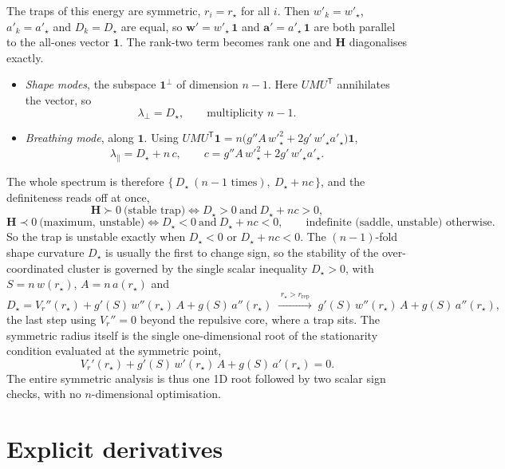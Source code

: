 \documentclass[11pt]{article}
\newcommand{\one}{\mathbf{1}}
\newcommand{\wv}{\mathbf{w}'}
\newcommand{\av}{\mathbf{a}'}
\newcommand{\tp}{^{\mathsf T}}
\begin{document}
The traps of this energy are symmetric, $r_i=r_\star$ for all $i$. Then $w'_k=w'_\star$,
$a'_k=a'_\star$ and $D_k=D_\star$ are equal, so $\wv=w'_\star\,\one$ and
$\av=a'_\star\,\one$ are both parallel to the all-ones vector $\one$. The rank-two term
becomes rank one and $\mathbf{H}$ diagonalises exactly.
\begin{itemize}
\item \emph{Shape modes}, the subspace $\one^{\perp}$ of dimension $n-1$. Here $UMU\tp$
      annihilates the vector, so
      \[
      \lambda_{\perp}=D_\star,\qquad\text{multiplicity } n-1 .
      \]
\item \emph{Breathing mode}, along $\one$. Using
      $UMU\tp\one=n\bigl(g''A\,w'^2_\star+2g'\,w'_\star a'_\star\bigr)\one$,
      \[
      \lambda_{\parallel}=D_\star+n\,c,\qquad
      c=g''A\,w'^2_\star+2g'\,w'_\star a'_\star .
      \]
\end{itemize}
The whole spectrum is therefore $\{\,D_\star\ (n-1\text{ times}),\ D_\star+nc\,\}$, and the
definiteness reads off at once,
\[
\boxed{\;
\mathbf{H}\succ0\ \text{(stable trap)}\iff D_\star>0\ \text{and}\ D_\star+nc>0,
\;}
\]
\[
\mathbf{H}\prec0\ \text{(maximum, unstable)}\iff D_\star<0\ \text{and}\ D_\star+nc<0,
\qquad\text{indefinite (saddle, unstable) otherwise.}
\]
So the trap is unstable exactly when $D_\star<0$ or $D_\star+nc<0$. The $(n-1)$-fold shape
curvature $D_\star$ is usually the first to change sign, so the stability of the
over-coordinated cluster is governed by the single scalar inequality $D_\star>0$, with
$S=n\,w(r_\star)$, $A=n\,a(r_\star)$ and
\[
D_\star=V_r''(r_\star)+g'(S)\,w''(r_\star)\,A+g(S)\,a''(r_\star)
\;\xrightarrow{\;r_\star>r_{\mathrm{rep}}\;}\;
g'(S)\,w''(r_\star)\,A+g(S)\,a''(r_\star),
\]
the last step using $V_r''=0$ beyond the repulsive core, where a trap sits. The symmetric
radius itself is the single one-dimensional root of the stationarity condition evaluated at
the symmetric point,
\[
V_r'(r_\star)+g'(S)\,w'(r_\star)\,A+g(S)\,a'(r_\star)=0 .
\]
The entire symmetric analysis is thus one 1D root followed by two scalar sign checks, with
no $n$-dimensional optimisation.

\section{Explicit derivatives}
\end{document}
